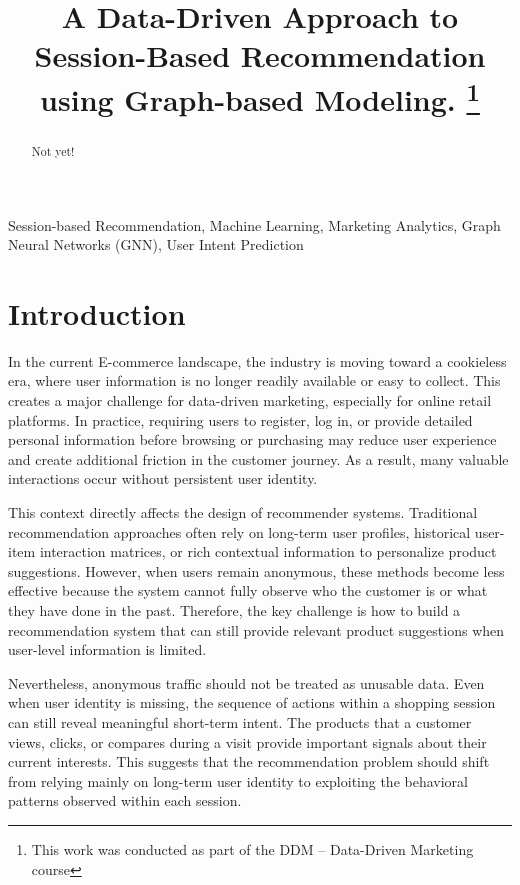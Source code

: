 \documentclass[conference]{IEEEtran}
\title{
A Data-Driven Approach to Session-Based Recommendation using Graph-based Modeling.
\thanks{This work was conducted as part of the DDM -- Data-Driven Marketing course}
}
\author{
\IEEEauthorblockN{
Group 3: Doan Quoc Bao, Dang Ngoc Hoa, Ly Thanh Long, Duong Thi Huyen Trang, Tran Anh Tuan
} 
\IEEEauthorblockA{
DSEB-MFE, NEU \\
Course: DDM -- Data-Driven Marketing 
}
}
\begin{document}
\maketitle

\begin{abstract}
Not yet!
\end{abstract}

\begin{IEEEkeywords}
Session-based Recommendation, Machine Learning, Marketing Analytics, Graph Neural Networks (GNN), User Intent Prediction
\end{IEEEkeywords}

\section{Introduction}

In the current E-commerce landscape, the industry is moving toward a cookieless era, where user information is no longer readily available or easy to collect. This creates a major challenge for data-driven marketing, especially for online retail platforms. In practice, requiring users to register, log in, or provide detailed personal information before browsing or purchasing may reduce user experience and create additional friction in the customer journey. As a result, many valuable interactions occur without persistent user identity.

This context directly affects the design of recommender systems. Traditional recommendation approaches often rely on long-term user profiles, historical user-item interaction matrices, or rich contextual information to personalize product suggestions. However, when users remain anonymous, these methods become less effective because the system cannot fully observe who the customer is or what they have done in the past. Therefore, the key challenge is how to build a recommendation system that can still provide relevant product suggestions when user-level information is limited.

Nevertheless, anonymous traffic should not be treated as unusable data. Even when user identity is missing, the sequence of actions within a shopping session can still reveal meaningful short-term intent. The products that a customer views, clicks, or compares during a visit provide important signals about their current interests. This suggests that the recommendation problem should shift from relying mainly on long-term user identity to exploiting the behavioral patterns observed within each session.
\end{document}
